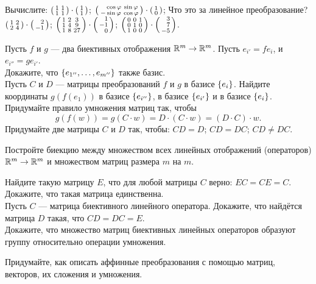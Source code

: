 \documentclass[a4paper,12pt]{article}
\newcommand{\smat}[1]{\hr{\begin{smallmatrix}#1\end{smallmatrix}}}
\begin{document}
    Вычислите:
    $\smat{1&1\\1&1}\cdot\smat{1\\1}$;
    $\smat{\phm\cos\ph&\sin\ph\\-\sin\ph&\cos\ph}\cdot\smat{1\\0}$;
    Что это за линейное преобразование?\\
    $\smat{1&2\\2&4}\cdot\smat{\phm2\\-1}$;
    $\smat{1&2&3\\1&4&9\\1&8&27}\cdot\smat{\phm1\\-1\\\phm0}$;
    $\smat{0&0&1\\0&1&0\\1&0&0}\cdot\smat{\phm3\\\phm7\\-5}$.



    Пусть $f$ и $g$ --- два биективных отображения $\mathbb{R}^m\rightarrow\mathbb{R}^m$. Пусть $e_{i'} = fe_i$, и $e_{i''} = ge_{i'}$.\\
    Докажите, что $\left\{e_{1''},\ldots, e_{m''}\right\}$ также базис.\\
    Пусть $C$ и $D$  --- матрицы преобразований $f$ и $g$ в базисе $\left\{e_i\right\}$.
    Найдите координаты $g(f(e_1))$ в базисе $\left\{e_{i''}\right\}$, в базисе $\left\{e_{i'}\right\}$ и в базисе $\left\{e_i\right\}$.\\
    Придумайте правило умножения матриц так, чтобы
    $$g(f(w)) = g(C\cdot w) = D\cdot (C\cdot w) = (D\cdot C) \cdot w.$$
\vspace{-9mm}
    Придумайте две матрицы $C$ и $D$ так, чтобы:
    $C D = D$;
    $C D = D C$;
    $C D \ne D C$.

    Постройте биекцию между множеством всех линейных отображений (операторов) $\mathbb{R}^m\rightarrow\mathbb{R}^m$ и множеством матриц размера $m$ на $m$.


    Найдите такую матрицу $E$, что для любой матрицы $C$ верно: $EC = CE = C$.\\
    Докажите, что такая матрица единственна.\\
    Пусть $C$ --- матрица биективного линейного оператора. Докажите, что найдётся матрица $D$ такая, что $CD=DC=E$.\\
    Докажите, что множество матриц биективных линейных операторов образуют группу относительно операции умножения.


    Придумайте, как описать аффинные преобразования с помощью матриц, векторов, их сложения и умножения.


\end{document}
